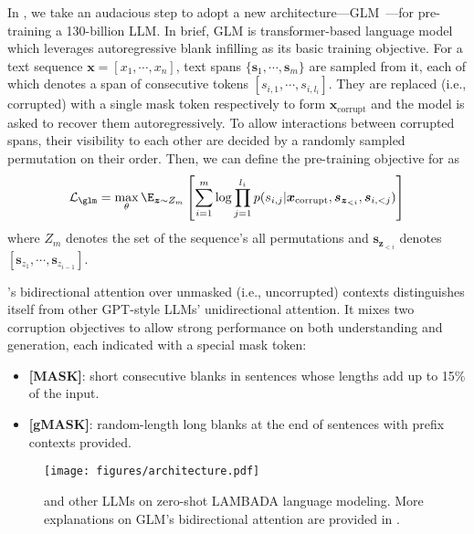 {In \glm, we take an audacious step to adopt a new architecture---GLM~\citep{du2022glm}---for pre-training a 130-billion LLM.
In brief, GLM is transformer-based language model which leverages autoregressive blank infilling as its basic training objective.
For a text sequence $\boldsymbol{x}=[x_1,\cdots,x_n]$, text spans $\{\boldsymbol{s}_1,\cdots,\boldsymbol{s}_m\}$ are sampled from it, each of which denotes a span of consecutive tokens $[s_{i,1},\cdots,s_{i,l_i}]$.
They are replaced (i.e., corrupted) with a single mask token respectively to form $\boldsymbol{x}_{\text{corrupt}}$ and the model is asked to recover them autoregressively.
To allow interactions between corrupted spans, their visibility to each other are decided by a randomly sampled permutation on their order.
Then, we can define the pre-training objective for \glm as
\begin{equation}
    \mathcal{L}_{\text \glm} 
    = \max_\theta \E_{\boldsymbol{z}\sim Z_m}\left[\sum_{i=1}^m\log \prod_{j=1}^{l_i} p(s_{i,j}|\boldsymbol{x}_{\text{corrupt}},\boldsymbol{s}_{\boldsymbol{z}_{<i}},\boldsymbol{s}_{i,<j}) \right]
    \label{eqn:objective}
\end{equation}
\noindent where $Z_m$ denotes the set of the sequence's all permutations and $\boldsymbol{s}_{\boldsymbol{z}_{<i}}$ denotes $[\boldsymbol{s}_{z_1},\cdots,\boldsymbol{s}_{z_{i-1}}]$.

\glm's bidirectional attention over unmasked (i.e., uncorrupted) contexts distinguishes itself from other GPT-style LLMs' unidirectional attention. 
It mixes two corruption objectives to allow strong performance on both understanding and generation, each indicated with a special mask token:
\begin{itemize}[leftmargin=*,itemsep=0pt,parsep=0.2em,topsep=0.0em,partopsep=0.0em]
    \item \textbf{[MASK]}: short consecutive blanks in sentences whose lengths add up to 15\% of the input.
    \item \textbf{[gMASK]}: random-length long blanks at the end of sentences with prefix contexts provided.
\end{itemize}

\begin{wrapfigure}{r}{6cm}
    \small
    \vspace{-6mm}
    \centering
    \texttt{[image: figures/architecture.pdf]}
    \caption{\glm and other LLMs on zero-shot LAMBADA language modeling. More explanations on GLM's bidirectional attention are provided in \citet{du2022glm}.}
    \label{fig:lambada}
    \vspace{-6mm}
\end{wrapfigure}

}
